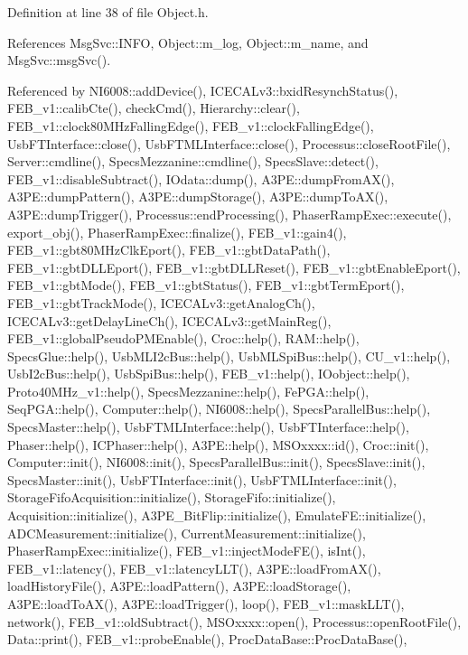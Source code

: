 Definition at line 38 of file Object.\+h.



References Msg\+Svc\+::\+I\+N\+FO, Object\+::m\+\_\+log, Object\+::m\+\_\+name, and Msg\+Svc\+::msg\+Svc().



Referenced by N\+I6008\+::add\+Device(), I\+C\+E\+C\+A\+Lv3\+::bxid\+Resynch\+Status(), F\+E\+B\+\_\+v1\+::calib\+Cte(), check\+Cmd(), Hierarchy\+::clear(), F\+E\+B\+\_\+v1\+::clock80\+M\+Hz\+Falling\+Edge(), F\+E\+B\+\_\+v1\+::clock\+Falling\+Edge(), Usb\+F\+T\+Interface\+::close(), Usb\+F\+T\+M\+L\+Interface\+::close(), Processus\+::close\+Root\+File(), Server\+::cmdline(), Specs\+Mezzanine\+::cmdline(), Specs\+Slave\+::detect(), F\+E\+B\+\_\+v1\+::disable\+Subtract(), I\+Odata\+::dump(), A3\+P\+E\+::dump\+From\+A\+X(), A3\+P\+E\+::dump\+Pattern(), A3\+P\+E\+::dump\+Storage(), A3\+P\+E\+::dump\+To\+A\+X(), A3\+P\+E\+::dump\+Trigger(), Processus\+::end\+Processing(), Phaser\+Ramp\+Exec\+::execute(), export\+\_\+obj(), Phaser\+Ramp\+Exec\+::finalize(), F\+E\+B\+\_\+v1\+::gain4(), F\+E\+B\+\_\+v1\+::gbt80\+M\+Hz\+Clk\+Eport(), F\+E\+B\+\_\+v1\+::gbt\+Data\+Path(), F\+E\+B\+\_\+v1\+::gbt\+D\+L\+L\+Eport(), F\+E\+B\+\_\+v1\+::gbt\+D\+L\+L\+Reset(), F\+E\+B\+\_\+v1\+::gbt\+Enable\+Eport(), F\+E\+B\+\_\+v1\+::gbt\+Mode(), F\+E\+B\+\_\+v1\+::gbt\+Status(), F\+E\+B\+\_\+v1\+::gbt\+Term\+Eport(), F\+E\+B\+\_\+v1\+::gbt\+Track\+Mode(), I\+C\+E\+C\+A\+Lv3\+::get\+Analog\+Ch(), I\+C\+E\+C\+A\+Lv3\+::get\+Delay\+Line\+Ch(), I\+C\+E\+C\+A\+Lv3\+::get\+Main\+Reg(), F\+E\+B\+\_\+v1\+::global\+Pseudo\+P\+M\+Enable(), Croc\+::help(), R\+A\+M\+::help(), Specs\+Glue\+::help(), Usb\+M\+L\+I2c\+Bus\+::help(), Usb\+M\+L\+Spi\+Bus\+::help(), C\+U\+\_\+v1\+::help(), Usb\+I2c\+Bus\+::help(), Usb\+Spi\+Bus\+::help(), F\+E\+B\+\_\+v1\+::help(), I\+Oobject\+::help(), Proto40\+M\+Hz\+\_\+v1\+::help(), Specs\+Mezzanine\+::help(), Fe\+P\+G\+A\+::help(), Seq\+P\+G\+A\+::help(), Computer\+::help(), N\+I6008\+::help(), Specs\+Parallel\+Bus\+::help(), Specs\+Master\+::help(), Usb\+F\+T\+M\+L\+Interface\+::help(), Usb\+F\+T\+Interface\+::help(), Phaser\+::help(), I\+C\+Phaser\+::help(), A3\+P\+E\+::help(), M\+S\+Oxxxx\+::id(), Croc\+::init(), Computer\+::init(), N\+I6008\+::init(), Specs\+Parallel\+Bus\+::init(), Specs\+Slave\+::init(), Specs\+Master\+::init(), Usb\+F\+T\+Interface\+::init(), Usb\+F\+T\+M\+L\+Interface\+::init(), Storage\+Fifo\+Acquisition\+::initialize(), Storage\+Fifo\+::initialize(), Acquisition\+::initialize(), A3\+P\+E\+\_\+\+Bit\+Flip\+::initialize(), Emulate\+F\+E\+::initialize(), A\+D\+C\+Measurement\+::initialize(), Current\+Measurement\+::initialize(), Phaser\+Ramp\+Exec\+::initialize(), F\+E\+B\+\_\+v1\+::inject\+Mode\+F\+E(), is\+Int(), F\+E\+B\+\_\+v1\+::latency(), F\+E\+B\+\_\+v1\+::latency\+L\+L\+T(), A3\+P\+E\+::load\+From\+A\+X(), load\+History\+File(), A3\+P\+E\+::load\+Pattern(), A3\+P\+E\+::load\+Storage(), A3\+P\+E\+::load\+To\+A\+X(), A3\+P\+E\+::load\+Trigger(), loop(), F\+E\+B\+\_\+v1\+::mask\+L\+L\+T(), network(), F\+E\+B\+\_\+v1\+::old\+Subtract(), M\+S\+Oxxxx\+::open(), Processus\+::open\+Root\+File(), Data\+::print(), F\+E\+B\+\_\+v1\+::probe\+Enable(), Proc\+Data\+Base\+::\+Proc\+Data\+Base(), 